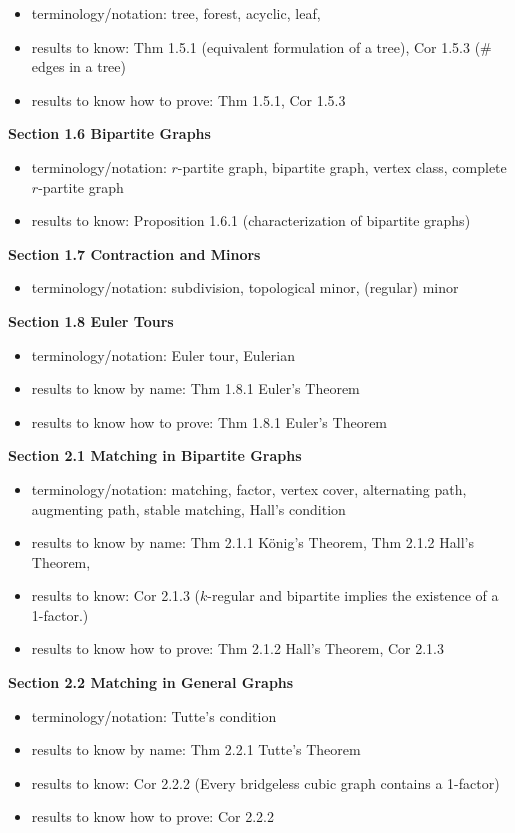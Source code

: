 \documentclass[12pt]{article}
\begin{document}
	\begin{itemize}
	\item terminology/notation: tree, forest, acyclic, leaf,
	\item results to know: Thm 1.5.1 (equivalent formulation of a tree), Cor 1.5.3 (\# edges in a tree)
	\item results to know how to prove: Thm 1.5.1, Cor 1.5.3
	\end{itemize}
\noindent \textbf{Section 1.6 Bipartite Graphs}
	\begin{itemize}
	\item terminology/notation: $r$-partite graph, bipartite graph, vertex class, complete $r$-partite graph
	\item results to know: Proposition 1.6.1 (characterization of bipartite graphs)
	\end{itemize}
\noindent \textbf{Section 1.7 Contraction and Minors}
	\begin{itemize}
	\item terminology/notation: subdivision, topological minor, (regular) minor
	\end{itemize}
\noindent \textbf{Section 1.8 Euler Tours}
	\begin{itemize}
	\item terminology/notation: Euler tour, Eulerian
	\item results to know by name: Thm 1.8.1 Euler's Theorem
	\item results to know how to prove: Thm 1.8.1 Euler's Theorem
	\end{itemize}
\noindent \textbf{Section 2.1 Matching in Bipartite Graphs}
	\begin{itemize}
	\item terminology/notation: matching, factor, vertex cover, alternating path, augmenting path, stable matching, Hall's condition
	\item results to know by name: Thm 2.1.1 K\"{o}nig's Theorem, Thm 2.1.2 Hall's Theorem,
	\item results to know: Cor 2.1.3 ($k$-regular and bipartite implies the existence of a 1-factor.)
	\item results to know how to prove: Thm 2.1.2 Hall's Theorem, Cor 2.1.3 
	\end{itemize}
\noindent \textbf{Section 2.2 Matching in General Graphs}
	\begin{itemize}
	\item terminology/notation: Tutte's condition
	\item results to know by name: Thm 2.2.1 Tutte's Theorem
	\item results to know: Cor 2.2.2 (Every bridgeless cubic graph contains a 1-factor)
	\item results to know how to prove: Cor 2.2.2
	\end{itemize}
\end{document}
